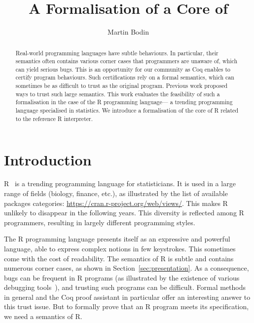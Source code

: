\documentclass[9pt, sigplan, natbib=false, screen=true]{acmart}
\title{A \Coq{} Formalisation of a Core of \R{}}
\author{Martin Bodin}
\affiliation{
    \institution{Center of Mathematical Modeling}
    \streetaddress{Beauchef 851}
    \city{Santiago}
    \country{Chile}
}
\newcommand\Coq{Coq}
\newcommand\R{R}
\begin{document}
\begin{abstract}
Real-world programming languages have subtle behaviours.
In particular, their semantics often contains various corner cases
that programmers are unaware of,
which can yield serious bugs.
This is an opportunity for our community
as \Coq{} enables to certify program behaviours.
Such certifications rely on a formal semantics,
which can sometimes be as difficult to trust as the original program.
Previous work proposed ways to trust such large semantics.
This work evaluates the feasibility of such a formalisation
in the case of the \R{} programming language---%
a trending programming language specialised in statistics.
We introduce a formalisation of the core of \R{}
related to the reference \R{} interpreter.
\end{abstract}

\maketitle

\section{Introduction}
\label{sec:introduction}

\R{}~\parencite{R, ihaka1996r, Rwebsite} is a trending
programming language for statisticians.
It is used in a large range of fields (biology, finance, etc.),
as illustrated by the list of available packages categories:
\url{https://cran.r-project.org/web/views/}.
This makes \R{} unlikely to disappear
in the following years.
This diversity is reflected among \R{} programmers,
resulting in largely different programming styles.

The \R{} programming language presents itself
as an expressive and powerful language,
able to express complex notions in few keystrokes.
This sometimes come with the cost of readability.
The semantics of \R{} is subtle
and contains numerous corner cases,
as shown in Section~\ref{sec:presentation}.
%
As a consequence, bugs can be frequent in \R{} programs
(as illustrated by the existence of various debugging tools~\parencite{mcpherson2014}),
and trusting such programs can be difficult.
Formal methods in general and the \Coq{} proof assistant in particular
offer an interesting answer to this trust issue.
But to formally prove that an \R{} program meets its specification,
we need a semantics of \R{}.
\end{document}
